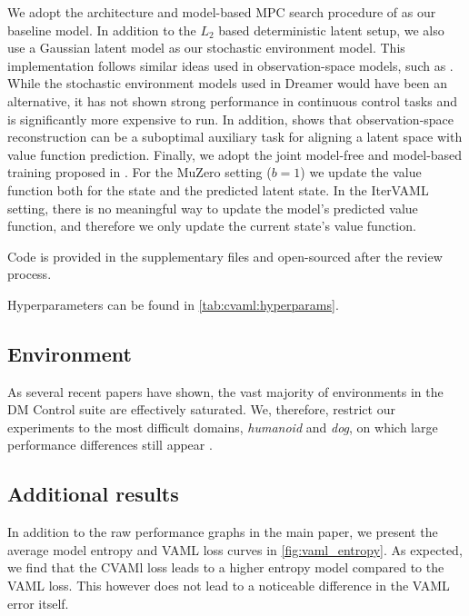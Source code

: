 We adopt the architecture and model-based MPC search procedure of \textcite{hansen2022temporal} as our baseline model.
In addition to the $L_2$ based deterministic latent setup, we also use a Gaussian latent model as our stochastic environment model.
This implementation follows similar ideas used in observation-space models, such as \textcite{pets,mbpo}.
While the stochastic environment models used in Dreamer \parencite{hafner2021mastering} would have been an alternative, it has not shown strong performance in continuous control tasks and is significantly more expensive to run.
In addition, \textcite{voelcker2024when} shows that observation-space reconstruction can be a suboptimal auxiliary task for aligning a latent space with value function prediction.
Finally, we adopt the joint model-free and model-based training proposed in \textcite{voelcker2025mad}.
For the MuZero setting ($b=1$) we update the value function both for the state and the predicted latent state.
In the IterVAML setting, there is no meaningful way to update the model's predicted value function, and therefore we only update the current state's value function.

Code is provided in the supplementary files and open-sourced after the review process.

Hyperparameters can be found in \autoref{tab:cvaml:hyperparams}.

\subsection{Environment}
\label{app:stoch_env}
As several recent papers have shown, the vast majority of environments in the DM Control suite are effectively saturated. 
We, therefore, restrict our experiments to the most difficult domains, \emph{humanoid} and \emph{dog}, on which large performance differences still appear \parencite{nauman2024bigger,voelcker2025mad,fujimoto2025towards}.


\subsection{Additional results}

In addition to the raw performance graphs in the main paper, we present the average model entropy and VAML loss curves in \autoref{fig:vaml_entropy}.
As expected, we find that the CVAMl loss leads to a higher entropy model compared to the VAML loss.
This however does not lead to a noticeable difference in the VAML error itself.

